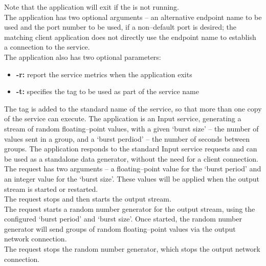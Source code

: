 Note that the application will exit if the
 is not running.\\

The application has two optional arguments -- an alternative endpoint name to be used and
the port number to be used, if a non--default port is desired; the matching client
application does not directly use the endpoint name to establish a connection to the
service.\\

The application also has two optional parameters:
\begin{itemize}
\item \textbf{-r:} report the service metrics when the application exits
\item \textbf{-t:} specifies the tag to be used as part of the service name
\end{itemize}
The tag is added to the standard name of the service, so that more than one copy of the
service can execute.
The  application is an Input service,
generating a stream of random floating--point values, with a given `burst size' -- the
number of values sent in a group, and a `burst perdiod' -- the number of seconds between
groups.
The application responds to the standard Input service requests and can be used as a
standalone data generator, without the need for a client connection.\\

The  request has two arguments -- a
floating--point value for the `burst period' and an integer value for the `burst size'.
These values will be applied when the output stream is started or restarted.\\

The  request stops and then
starts the output stream.\\

The  request starts a random
number generator for the output stream, using the configured `burst period' and
`burst size'.
Once started, the random number generator will send groups of random floating--point
values via the output \yarp{} network connection.\\

The  request stops the random
number generator, which stops the output \yarp{} network connection.\\ 

